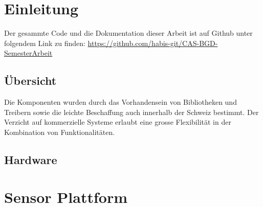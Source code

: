 \documentclass[
  12pt, %
  a4paper, %
  twoside, %
  openany, %
  numbers=noenddot, %
  BCOR=5mm, %
  parskip=half*, %
  thesis, %
]{bfhbook}
\begin{document}
\chapter{Einleitung}
Der gesammte Code und die Dokumentation dieser Arbeit ist auf Github unter folgendem Link zu finden: \url{https://github.com/habis-git/CAS-BGD-SemesterArbeit}
\section{Übersicht}
Die Komponenten wurden durch das Vorhandensein von Bibliotheken und Treibern sowie die leichte Beschaffung auch innerhalb der Schweiz bestimmt. Der Verzicht auf kommerzielle Systeme erlaubt eine grosse Flexibilität in der Kombination von Funktionalitäten.
\section{Hardware}

\chapter{Sensor Plattform}
\end{document}
